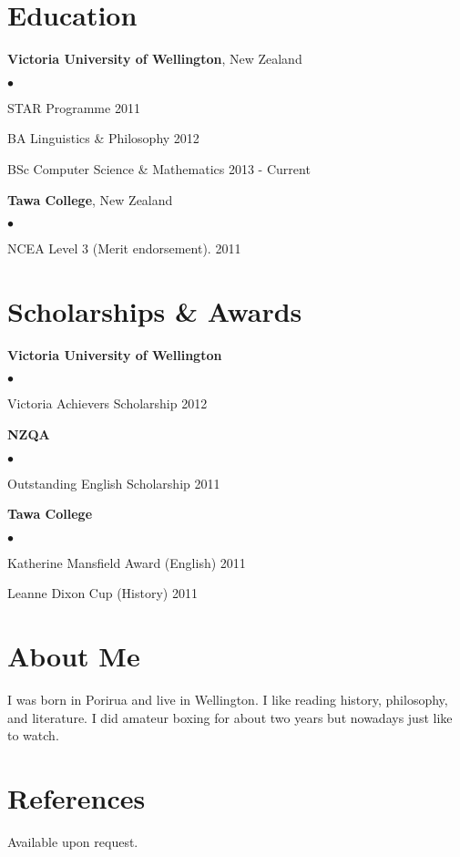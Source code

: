 \documentclass[margin,line]{res}
\newenvironment{list2}{
  \begin{list}{$\bullet$}{%
      \setlength{\itemsep}{0in}
      \setlength{\parsep}{0in} \setlength{\parskip}{0in}
      \setlength{\topsep}{0in} \setlength{\partopsep}{0in}
      \setlength{\leftmargin}{0.2in}}}
  {\end{list}}
\begin{document}
\begin{resume}
\section{\sc Education}
{\bf Victoria University of Wellington}, New Zealand
\begin{list2}
	\item STAR Programme \hfill 2011
	\item BA Linguistics \& Philosophy \hfill 2012
	\item BSc Computer Science \& Mathematics \hfill 2013 - Current
\end{list2}

{\bf Tawa College}, New Zealand
\begin{list2}
	\item NCEA Level 3 (Merit endorsement). \hfill 2011
\end{list2}

\section{\sc Scholarships \& Awards}

{\bf Victoria University of Wellington}
\begin{list2}
	\item Victoria Achievers Scholarship \hfill 2012
\end{list2}

{\bf NZQA}
\begin{list2}
	\item Outstanding English Scholarship \hfill 2011
\end{list2}

{\bf Tawa College}
\begin{list2}
	\item Katherine Mansfield Award (English) \hfill 2011
	\item Leanne Dixon Cup (History) \hfill 2011
\end{list2}

\section{\sc About Me}
I was born in Porirua and live in Wellington. I like reading history, philosophy, and literature. I did amateur boxing for about two years but nowadays just like to watch.

\section{\sc References }
Available upon request.

\end{resume}
\end{document}
